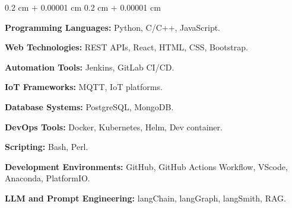 \documentclass[10pt, letterpaper]{article}
\newenvironment{onecolentry}{
    \begin{adjustwidth}{
        0.2 cm + 0.00001 cm
    }{
        0.2 cm + 0.00001 cm
    }
}{
    \end{adjustwidth}
} %
\begin{document}
  \vspace{- 0.5 cm}
    \begin{onecolentry}
\item \textbf{Programming Languages:} Python, C/C++, JavaScript.
\item \textbf{Web Technologies:} REST APIs, React, HTML, CSS, Bootstrap.
\item \textbf{Automation Tools:} Jenkins, GitLab CI/CD.
\item \textbf{IoT Frameworks:} MQTT, IoT platforms.
\item \textbf{Database Systems:} PostgreSQL, MongoDB.
\item \textbf{DevOps Tools:} Docker, Kubernetes, Helm, Dev container.
\item \textbf{Scripting:} Bash, Perl.
\item \textbf{Development Environments:} GitHub, GitHub Actions Workflow, VScode, Anaconda, PlatformIO.
\item \textbf{LLM and Prompt Engineering:} langChain, langGraph, langSmith, RAG.
  \end{onecolentry}
  
\end{document}

